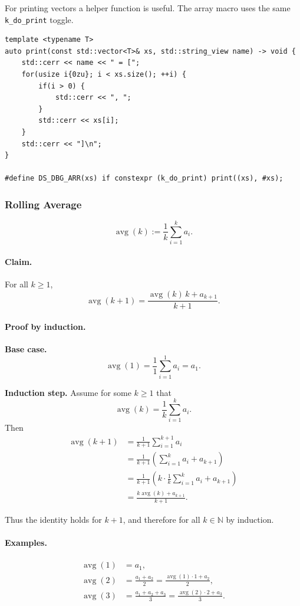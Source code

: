 \documentclass{article}
\begin{document}
For printing vectors a helper function is useful. The array macro uses the same \texttt{k\_do\_print} toggle.

\begin{lstlisting}
template <typename T>
auto print(const std::vector<T>& xs, std::string_view name) -> void {
    std::cerr << name << " = [";
    for(usize i{0zu}; i < xs.size(); ++i) {
        if(i > 0) {
            std::cerr << ", ";
        }
        std::cerr << xs[i];
    }
    std::cerr << "]\n";
}

#define DS_DBG_ARR(xs) if constexpr (k_do_print) print((xs), #xs);
\end{lstlisting}
\subsubsection{Rolling Average}
\[
\operatorname{avg}(k)
:= \frac{1}{k} \sum_{i=1}^{k} a_i.
\]

\paragraph{Claim.}
For all \( k \ge 1 \),
\[
\operatorname{avg}(k+1)
= \frac{\operatorname{avg}(k)\,k + a_{k+1}}{k+1}.
\]

\paragraph{Proof by induction.}

\textbf{Base case.}
\[
\operatorname{avg}(1)
= \frac{1}{1} \sum_{i=1}^{1} a_i
= a_1.
\]

\textbf{Induction step.}
Assume for some \( k \ge 1 \) that
\[
\operatorname{avg}(k)
= \frac{1}{k} \sum_{i=1}^{k} a_i.
\]
Then
\begin{align}
\operatorname{avg}(k+1)
&= \frac{1}{k+1} \sum_{i=1}^{k+1} a_i \\[6pt]
&= \frac{1}{k+1} \left( \sum_{i=1}^{k} a_i + a_{k+1} \right) \\[6pt]
&= \frac{1}{k+1} \left( k \cdot \frac{1}{k} \sum_{i=1}^{k} a_i + a_{k+1} \right) \\[6pt]
&= \frac{k \operatorname{avg}(k) + a_{k+1}}{k+1}.
\end{align}

Thus the identity holds for \( k+1 \), and therefore for all \( k \in \mathbb{N} \) by induction.

\paragraph{Examples.}
\begin{align*}
\operatorname{avg}(1)
&= a_1, \\[6pt]
\operatorname{avg}(2)
&= \frac{a_1 + a_2}{2}
 = \frac{\operatorname{avg}(1)\cdot 1 + a_2}{2}, \\[6pt]
\operatorname{avg}(3)
&= \frac{a_1 + a_2 + a_3}{3}
 = \frac{\operatorname{avg}(2)\cdot 2 + a_3}{3}.
\end{align*}
\end{document}
